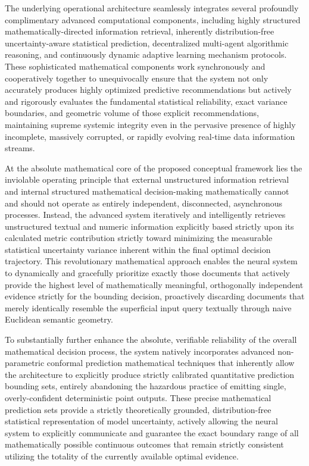 \documentclass[12pt,a4paper,oneside]{report}
\theoremstyle{definition}
\theoremstyle{remark}
\begin{document}
The underlying operational architecture seamlessly integrates several profoundly complimentary advanced computational components, including highly structured mathematically-directed information retrieval, inherently distribution-free uncertainty-aware statistical prediction, decentralized multi-agent algorithmic reasoning, and continuously dynamic adaptive learning mechanism protocols. These sophisticated mathematical components work synchronously and cooperatively together to unequivocally ensure that the system not only accurately produces highly optimized predictive recommendations but actively and rigorously evaluates the fundamental statistical reliability, exact variance boundaries, and geometric volume of those explicit recommendations, maintaining supreme systemic integrity even in the pervasive presence of highly incomplete, massively corrupted, or rapidly evolving real-time data information streams.

At the absolute mathematical core of the proposed conceptual framework lies the inviolable operating principle that external unstructured information retrieval and internal structured mathematical decision-making mathematically cannot and should not operate as entirely independent, disconnected, asynchronous processes. Instead, the advanced system iteratively and intelligently retrieves unstructured textual and numeric information explicitly based strictly upon its calculated metric contribution strictly toward minimizing the measurable statistical uncertainty variance inherent within the final optimal decision trajectory. This revolutionary mathematical approach enables the neural system to dynamically and gracefully prioritize exactly those documents that actively provide the highest level of mathematically meaningful, orthogonally independent evidence strictly for the bounding decision, proactively discarding documents that merely identically resemble the superficial input query textually through naive Euclidean semantic geometry.

To substantially further enhance the absolute, verifiable reliability of the overall mathematical decision process, the system natively incorporates advanced non-parametric conformal prediction mathematical techniques that inherently allow the architecture to explicitly produce strictly calibrated quantitative prediction bounding sets, entirely abandoning the hazardous practice of emitting single, overly-confident deterministic point outputs. These precise mathematical prediction sets provide a strictly theoretically grounded, distribution-free statistical representation of model uncertainty, actively allowing the neural system to explicitly communicate and guarantee the exact boundary range of all mathematically possible continuous outcomes that remain strictly consistent utilizing the totality of the currently available optimal evidence.
\end{document}
